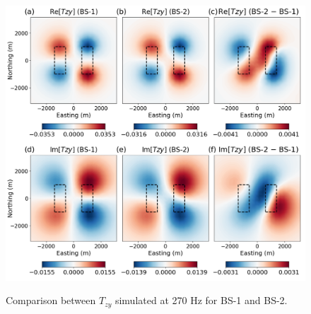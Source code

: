 \documentclass{segabs}
\begin{document}
\begin{figure}
\includegraphics[width=\columnwidth]{images/anomalies_tipper.png}
\label{fig:tipper_anomalies}
\vspace{-20pt}
\caption{Comparison between $T_{zy}$ simulated at 270 Hz for BS-1 and BS-2.}
\end{figure}
\end{document}

